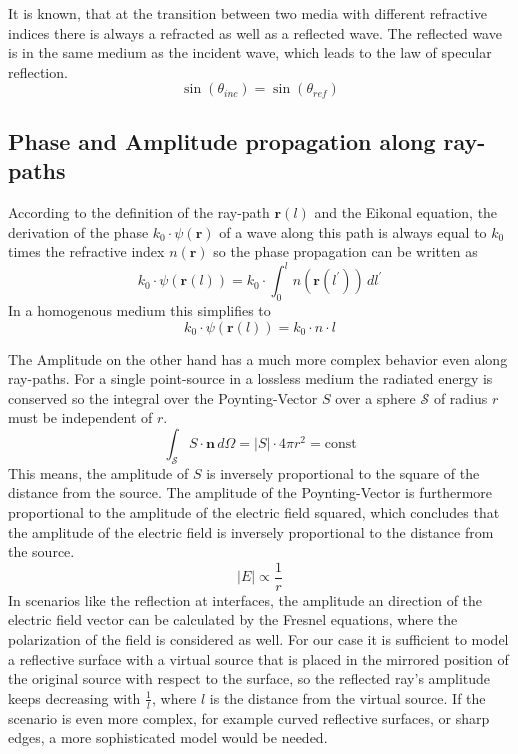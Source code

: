 It is known, that at the transition between two media with different refractive indices there is always a refracted as well as a reflected wave.
The reflected wave is in the same medium as the incident wave, which leads to the law of specular reflection.
\begin{equation}
    \sin(\theta_{inc}) = \sin(\theta_{ref})
\end{equation}


\subsection{Phase and Amplitude propagation along ray-paths}
According to the definition of the ray-path \(\mathbf{r}(l)\) and the Eikonal equation, the derivation of the phase \(k_0 \cdot \psi(\mathbf{r})\) of a wave along this path is always equal to \(k_0\) times the refractive index \(n(\mathbf{r})\) so the phase propagation can be written as
\begin{equation}
    k_0 \cdot \psi(\mathbf{r}(l)) = k_0 \cdot \int_{0}^{l} n(\mathbf{r}(l^{\prime})) \, dl^{\prime}
\end{equation}
In a homogenous medium this simplifies to
\begin{equation}
    k_0 \cdot \psi(\mathbf{r}(l)) = k_0 \cdot n \cdot l
\end{equation}

The Amplitude on the other hand has a much more complex behavior even along ray-paths.
For a single point-source in a lossless medium the radiated energy is conserved so the integral over the Poynting-Vector \(S\) over a sphere \(\mathcal{S} \) of radius \(r\) must be independent of \(r\).
\begin{equation}
    \int_\mathcal{S}  S \cdot \mathbf{n} \, d\Omega = |S| \cdot 4\pi r^2 = \text{const}
\end{equation}
This means, the amplitude of \(S\) is inversely proportional to the square of the distance from the source.
The amplitude of the Poynting-Vector is furthermore proportional to the amplitude of the electric field squared, which concludes that the amplitude of the electric field is inversely proportional to the distance from the source.
\begin{equation}
    |E| \propto \frac{1}{r}
\end{equation}
In scenarios like the reflection at interfaces, the amplitude an direction of the electric field vector can be calculated by the Fresnel equations, where the polarization of the field is considered as well.
For our case it is sufficient to model a reflective surface with a virtual source that is placed in the mirrored position of the original source with respect to the surface, so the reflected ray's amplitude keeps decreasing with \(\frac{1}{l}\), where \(l\) is the distance from the virtual source.
If the scenario is even more complex, for example curved reflective surfaces, or sharp edges, a more sophisticated model would be needed.

